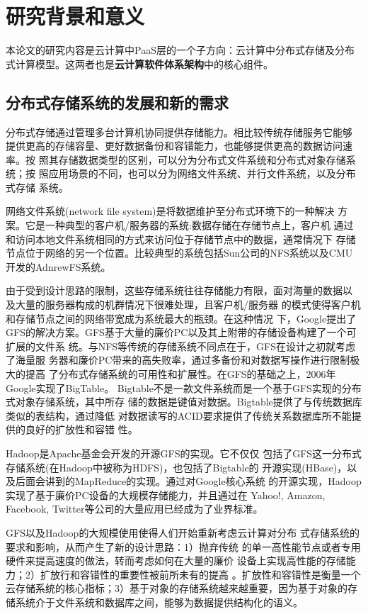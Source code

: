 \section{研究背景和意义}

本论文的研究内容是云计算中PaaS层的一个子方向：云计算中分布式存储及分布
式计算模型。这两者也是\textbf{云计算软件体系架构}中的核心组件。

\subsection{分布式存储系统的发展和新的需求}
分布式存储通过管理多台计算机协同提供存储能力。相比较传统存储服务它能够
提供更高的存储容量、更好数据备份和容错能力，也能够提供更高的数据访问速率。按
照其存储数据类型的区别，可以分为分布式文件系统和分布式对象存储系统；按
照应用场景的不同，也可以分为网络文件系统、并行文件系统，以及分布式存储
系统。

网络文件系统(network file system)是将数据维护至分布式环境下的一种解决
方案。它是一种典型的客户机/服务器的系统:数据存储在存储节点上，客户机
通过和访问本地文件系统相同的方式来访问位于存储节点中的数据，通常情况下
存储节点位于网络的另一个位置。比较典型的系统包括Sun公司的NFS系统\cite{Sandberg85designand}以及CMU开发的AdnrewFS系统\cite{howard1988scale}。

由于受到设计思路的限制，这些存储系统往往存储能力有限，面对海量的数据以
及大量的服务器构成的机群情况下很难处理，且客户机/服务器
的模式使得客户机和存储节点之间的网络带宽成为系统最大的瓶颈。在这种情况
下，Google提出了GFS\cite{ghemawat2003google}的解决方案。GFS基于大量的廉价PC以及其上附带的存储设备构建了一个可扩展的文件系
统。与NFS等传统的存储系统不同点在于，GFS在设计之初就考虑了海量服
务器和廉价PC带来的高失败率，通过多备份和对数据写操作进行限制极大的提高
了分布式存储系统的可用性和扩展性。在GFS的基础之上，2006年Google实现了BigTable\cite{chang2008bigtable}。
Bigtable不是一款文件系统而是一个基于GFS实现的分布式对象存储系统，其中所存
储的数据是键值对数据。Bigtable提供了与传统数据库类似的表结构，通过降低
对数据读写的ACID要求提供了传统关系数据库所不能提供的良好的扩放性和容错
性。

Hadoop\cite{hadoopproject}是Apache基金会开发的开源GFS的实现。它不仅仅
包括了GFS这一分布式存储系统(在Hadoop中被称为HDFS)，也包括了Bigtable的
开源实现(HBase)，以及后面会讲到的MapReduce的实现。通过对Google核心系统
的开源实现，Hadoop实现了基于廉价PC设备的大规模存储能力，并且通过在
Yahoo!, Amazon, Facebook, Twitter等公司的大量应用已经成为了业界标准。

GFS以及Hadoop的大规模使用使得人们开始重新考虑云计算对分布
式存储系统的要求和影响，从而产生了新的设计思路：1）抛弃传统
的单一高性能节点或者专用硬件来提高速度的做法，转而考虑如何在大量的廉价
设备上实现高性能的存储能力；2）扩放行和容错性的重要性被前所未有的提高
。扩放性和容错性是衡量一个云存储系统的核心指标；3）基于对象的存储系统越来越重要，因为基于对象的存储系统介于文件系统和数据库之间，能够为数据提供结构化的语义。 

